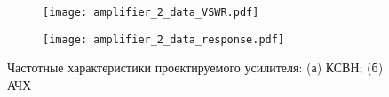 \begin{figure}[!ht]
    \centering
    \begin{subfigure}[b]{0.45\textwidth}
        \centering
        \texttt{[image: amplifier\_2\_data\_VSWR.pdf]}
        \caption{}%
        \label{fig:amplifier_2_data_VSWR}
    \end{subfigure}
    \hfill
    \begin{subfigure}[b]{0.45\textwidth}
        \centering
        \texttt{[image: amplifier\_2\_data\_response.pdf]}
        \caption{}%
        \label{fig:amplifier_2_data_response}
    \end{subfigure}
    \caption{%
        Частотные характеристики проектируемого усилителя:
        (а) КСВН;
        (б) АЧХ
    }%
    \label{fig:amplifier_2_data}
\end{figure}

